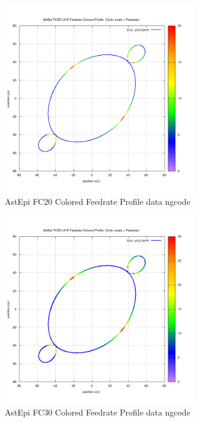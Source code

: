 \begin{figure}
	\caption     {AstEpi FC20 Colored Feedrate Profile data ngcode}
	\label{18-img-AstEpi-FC20-Colored-Feedrate-Profile-data_ngcode.png}
\includegraphics[width=0.75\textwidth]{Chap4/appendix/app-AstEpi/plots/18-img-AstEpi-FC20-Colored-Feedrate-Profile-data_ngcode.png}
\end{figure}

\clearpage
\pagebreak

\begin{figure}
	\caption     {AstEpi FC30 Colored Feedrate Profile data ngcode}
	\label{19-img-AstEpi-FC30-Colored-Feedrate-Profile-data_ngcode.png}
\includegraphics[width=0.75\textwidth]{Chap4/appendix/app-AstEpi/plots/19-img-AstEpi-FC30-Colored-Feedrate-Profile-data_ngcode.png}
\end{figure}


